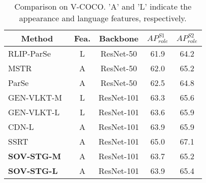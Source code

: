\documentclass[10pt,twocolumn,letterpaper]{article}
\begin{document}
\begin{table*}[!t]
\begin{minipage}{0.34\linewidth}
{\begin{tabular}{@{}ccccc@{}}
                \hline
                \multicolumn{1}{c|}{Method}                                  & \multicolumn{1}{c|}{Fea.} & \multicolumn{1}{c|}{Backbone} & \multicolumn{1}{c}{$AP_{role}^{S1}$} & \multicolumn{1}{c}{$AP_{role}^{S2}$}  \\ \hline \hline
\multicolumn{1}{l|}{RLIP-ParSe~\cite{yuan2022rlip}}          & \multicolumn{1}{c|}{L}        & \multicolumn{1}{c|}{ResNet-50}       & 61.9          & 64.2  \\
                \multicolumn{1}{l|}{MSTR~\cite{Kim_2022_CVPR}}               & \multicolumn{1}{c|}{A}        & \multicolumn{1}{c|}{ResNet-50}       & 62.0          & 65.2  \\
\multicolumn{1}{l|}{ParSe~\cite{yuan2022rlip}}               & \multicolumn{1}{c|}{A}        & \multicolumn{1}{c|}{ResNet-50}       & 62.5          & 64.8  \\
                \multicolumn{1}{l|}{GEN-VLKT-M~\cite{liao2022gen}}           & \multicolumn{1}{c|}{L}        & \multicolumn{1}{c|}{ResNet-101}      & 63.3          & 65.6  \\
                \multicolumn{1}{l|}{GEN-VLKT-L~\cite{liao2022gen}}           & \multicolumn{1}{c|}{L}        & \multicolumn{1}{c|}{ResNet-101}      & 63.6          & 65.9  \\
                \multicolumn{1}{l|}{CDN-L~\cite{zhang2021mining}}            & \multicolumn{1}{c|}{A}        & \multicolumn{1}{c|}{ResNet-101}      & 63.9          & 65.9  \\
                \multicolumn{1}{l|}{SSRT~\cite{iftekhar2022look}}            & \multicolumn{1}{c|}{A}        & \multicolumn{1}{c|}{ResNet-101}      & 65.0          & 67.1  \\ \hline
                \multicolumn{1}{l|}{\textbf{SOV-STG-M}}                      & \multicolumn{1}{c|}{A}        & \multicolumn{1}{c|}{ResNet-101}      & 63.7          & 65.2  \\
                \multicolumn{1}{l|}{\textbf{SOV-STG-L}}                      & \multicolumn{1}{c|}{A}        & \multicolumn{1}{c|}{ResNet-101}      & 63.9          & 65.4  \\ 
                \hline
            \end{tabular}
        }
        \caption{Comparison on V-COCO. 'A' and 'L' indicate the appearance and language features, respectively.}
        \label{tab:tab2}
        \vspace{4.3mm}
        \renewcommand\thetable{4}
\end{minipage}
\end{table*}
\end{document}
